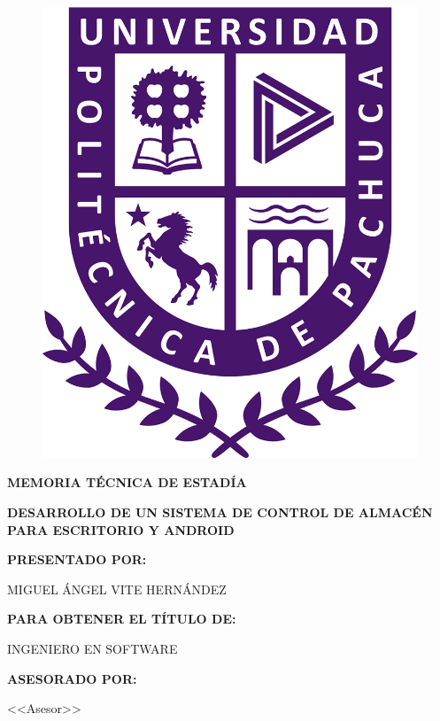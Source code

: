 \begin{titlepage}
	\begin{figure}
		\begin{center}
			\includegraphics[scale=0.2]{imagenes/logo.png}
		\end{center}
	\end{figure}		
	
	\begin{center}
		\huge{\bf MEMORIA TÉCNICA DE ESTADÍA}
		
		\vspace*{0.5cm}
		\sc \Huge {\bf DESARROLLO DE UN SISTEMA DE CONTROL DE ALMACÉN PARA ESCRITORIO Y ANDROID}
		
		\vspace*{1cm}
		\sc \Large {\bf PRESENTADO POR:}
		
		\sc \Large MIGUEL ÁNGEL VITE HERNÁNDEZ
		
		\vspace*{1cm}
		\sc \Large {\bf PARA OBTENER EL TÍTULO DE:}
		
		\sc \Large INGENIERO EN SOFTWARE
		
		\vspace*{1cm}		
		\sc \Large {\bf ASESORADO POR:}
		
		\sc \Large <<Asesor>>
		\vfill
		\begin{table}[H]
			\centering
		\end{table}
	\end{center}
\end{titlepage}